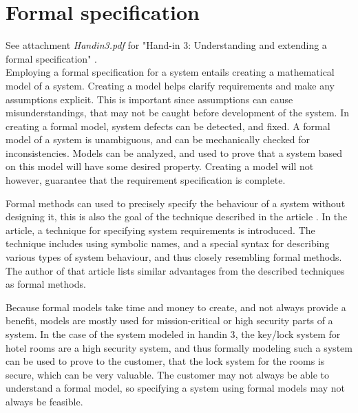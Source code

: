 \documentclass[Main]{subfiles}
\begin{document}
\section{Formal specification}

See attachment \textit{Handin3.pdf} for "Hand-in 3: Understanding and extending a formal specification" \parencite[]{HI3}.
\\


Employing a formal specification for a system entails creating a mathematical model of a system. 
Creating a model helps clarify requirements and make any assumptions explicit. 
This is important since assumptions can cause misunderstandings, that may not be caught before development of the system. 
In creating a formal model, system defects can be detected, and fixed. 
A formal model of a system is unambiguous, and can be mechanically checked for inconsistencies. 
Models can be analyzed, and used to prove that a system based on this model will have some desired property. 
Creating a model will not however, guarantee that the requirement specification is complete.

Formal methods can used to precisely specify the behaviour of a system without designing it, this is also the goal of the technique described in the article \parencite[]{Specifying}. 
In the article, a technique for specifying system requirements is introduced. 
The technique includes using symbolic names, and a special syntax for describing various types of system behaviour, and thus closely resembling formal methods. 
The author of that article lists similar advantages from the described techniques as formal methods. 

Because formal models take time and money to create, and not always provide a benefit, models are mostly used for mission-critical or high security parts of a system. 
In the case of the system modeled in handin 3\parencite[1-5]{HI3}, the key/lock system for hotel rooms are a high security system, and thus formally modeling such a system can be used to prove to the customer, that the lock system for the rooms is secure, which can be very valuable. 
The customer may not always be able to understand a formal model, so specifying a system using formal models may not always be feasible.
\end{document}
